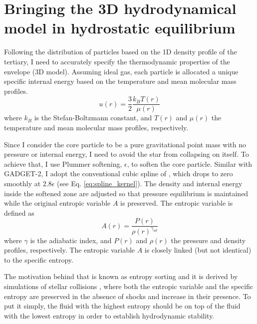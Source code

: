 \section{Bringing the 3D hydrodynamical model in hydrostatic equilibrium}
 
Following the distribution of particles based on the 1D density profile of the tertiary, I need to accurately specify the thermodynamic properties of the envelope (3D model). Assuming ideal gas, each particle is allocated a unique specific internal energy based on the temperature and mean molecular mass profiles.
\begin{equation}\label{eq:internal_energy}
    u(r) = \frac{3}{2} \frac{k_B T(r)}{\mu(r)}
\end{equation}
where $k_B$ is the Stefan-Boltzmann constant, and $T(r)$ and $\mu(r)$ the temperature and mean molecular mass profiles, respectively. 

Since I consider the core particle to be a pure gravitational point mass with no pressure or internal energy, I need to avoid the star from collapsing on itself.
To achieve that, I use Plummer softening, $\epsilon$, to soften the core particle. Similar with GADGET-2, I adopt the conventional cubic spline of \cite{monaghan1985refined}, which drops to zero smoothly at $2.8 \epsilon$ (see Eq. \eqref{eq:spline_kernel}). The density and internal energy inside the softened zone are adjusted so that pressure equilibrium is maintained while the original entropic variable $A$ is preserved. The entropic variable is defined as
\begin{equation}
    A(r) = \frac{P(r)}{\rho(r)^{\gamma_{ad}}}
\end{equation}
where $\gamma$ is the adiabatic index, and $P(r)$ and $\rho(r)$ the pressure and density profiles, respectively. The entropic variable $A$ is closely linked (but not identical) to the specific entropy.

The motivation behind that is known as entropy sorting and it is derived by simulations of stellar collisions \citep{lombardi1995collisions,lombardi2003modelling,lombardi2006stellar,gaburov2008mixing,gaburov2010onset}, where both the entropic variable and the specific entropy are preserved in the absence of shocks and increase in their presence. To put it simply, the fluid with the highest entropy should be on top of the fluid with the lowest entropy in order to establish hydrodynamic stability. 

